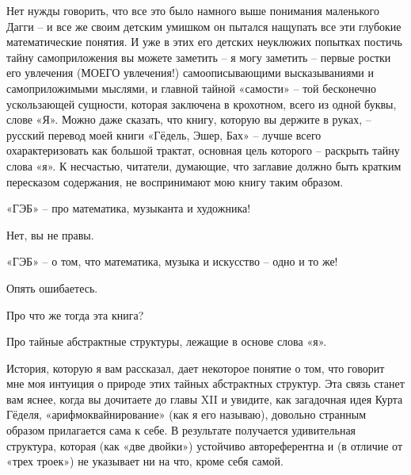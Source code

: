 \documentclass[../main.tex]{subfiles}
\begin{document}
Нет нужды говорить, что все это было намного выше понимания маленького Дагги \--- и все же своим детским умишком он пытался нащупать все эти глубокие математические понятия.
И уже в этих его детских неуклюжих попытках постичь тайну самоприложения вы можете заметить \--- я могу заметить \--- первые ростки его увлечения (МОЕГО увлечения!) самоописывающими высказываниями и самоприложимыми мыслями, и главной тайной «самости» \--- той бесконечно ускользающей сущности, которая заключена в крохотном, всего из одной буквы, слове «Я».
Можно даже сказать, что книгу, которую вы держите в руках, \--- русский перевод моей книги «Гёдель, Эшер, Бах» \--- лучше всего охарактеризовать как большой трактат, основная цель которого \--- раскрыть тайну слова «я».
К несчастью, читатели, думающие, что заглавие должно быть кратким пересказом содержания, не воспринимают мою книгу таким образом.

\begin{adjustwidth}{\parindent}{}
\begin{dialogue}
 «ГЭБ» \--- про математика, музыканта и художника!

 Нет, вы не правы.

 «ГЭБ» \--- о том, что математика, музыка и искусство \--- одно и то же!

 Опять ошибаетесь.

 Про что же тогда эта книга?

 Про тайные абстрактные структуры, лежащие в основе слова «я».
\end{dialogue}
\end{adjustwidth}

История, которую я вам рассказал, дает некоторое понятие о том, что говорит мне моя интуиция о природе этих тайных абстрактных структур.
Эта связь станет вам яснее, когда вы дочитаете до главы XII и увидите, как загадочная идея Курта Гёделя, «арифмоквайнирование» (как я его называю), довольно странным образом прилагается сама к себе.
В результате получается удивительная структура, которая (как «две двойки») устойчиво автореферентна и (в отличие от «трех троек») не указывает ни на что, кроме себя самой.
\end{document}

